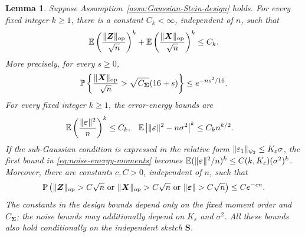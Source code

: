 \documentclass{article}
\theoremstyle{plain}
\newtheorem{lemma}[theorem]{Lemma}
\theoremstyle{definition}
\theoremstyle{definition}
\DeclarePairedDelimiter\norm{\lVert}{\rVert}
\def\E{{\mathbb{E}}}
\def\P{{\mathbb{P}}}
\def\mathbold{\boldsymbol}
\def\bS{\mathbold{S}}\def\hbS{{\widehat{\bS}}}\def\tbS{{\widetilde{\bS}}}
\def\bX{\mathbold{X}}\def\hbX{{\widehat{\bX}}}\def\tbX{{\tilde{\bX}}}\def\bXbar{{\overline \bX}}
\def\bZ{\mathbold{Z}}\def\hbZ{{\widehat{\bZ}}}\def\tbZ{{\widetilde{\bZ}}}
\def\ep{\varepsilon}\def\eps{\epsilon}\def\veps{\varepsilon}
\def\bep{ {\mathbold{\ep} }}
\def\bSigma{\mathbold{\Sigma}}\def\hbSigma{{\widehat{\bSigma}}}
\begin{document}
\begin{lemma}
\label{lem:opnorm-X-bound}
Suppose Assumption~\ref{assu:Gaussian-Stein-design} holds.
For every fixed integer $k\geq1$, there is a constant $C_k<\infty$,
independent of $n$, such that
\begin{align}
    \E\left(\frac{\norm{\bZ}_{\rm op}}{\sqrt n}\right)^k
    +\E\left(\frac{\norm{\bX}_{\rm op}}{\sqrt n}\right)^k
    \leq C_k.
    \label{eq:opnorm-XZ-moments}
\end{align}
More precisely, for every $s\geq0$,
\begin{align}
    \P\left\{
       \frac{\norm{\bX}_{\rm op}}{\sqrt n}
       >\sqrt{C_{\bSigma}}(16+s)
    \right\}
    \leq e^{-ns^2/16}.
    \label{eq:opnorm-X-tail}
\end{align}
For every fixed integer $k\geq1$, the error-energy bounds are
\begin{align}
    \E\left(\frac{\norm{\bep}^2}{n}\right)^k
       &\leq C_k,
    &
    \E\left|\norm{\bep}^2-n\sigma^2\right|^k
       &\leq C_kn^{k/2}.
    \label{eq:noise-energy-moments}
\end{align}
If the sub-Gaussian condition is expressed in the relative form
$\norm{\varepsilon_1}_{\psi_2}\leq K_\varepsilon\sigma$, the first bound in
\eqref{eq:noise-energy-moments} becomes
$\E(\norm{\bep}^2/n)^k\leq C(k,K_\varepsilon)(\sigma^2)^k$.
Moreover, there are constants $c,C>0$,
independent of $n$, such that
\begin{align}
    \P\left(
       \norm{\bZ}_{\rm op}>C\sqrt n
       \ \text{or}\
       \norm{\bX}_{\rm op}>C\sqrt n
       \ \text{or}\
       \norm{\bep}>C\sqrt n
    \right)
    \leq Ce^{-cn}.
    \label{eq:design-noise-tail}
\end{align}
The constants in the design bounds depend only on the fixed moment order and
$C_{\bSigma}$; the noise bounds may additionally depend on
$K_\varepsilon$ and $\sigma^2$.
All these bounds also hold conditionally on the independent sketch $\bS$.
\end{lemma}
\end{document}
